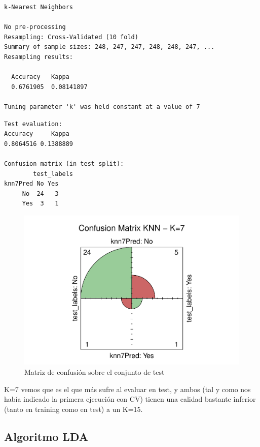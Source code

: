 \begin{verbatim}
k-Nearest Neighbors 

No pre-processing
Resampling: Cross-Validated (10 fold) 
Summary of sample sizes: 248, 247, 247, 248, 248, 247, ... 
Resampling results:

  Accuracy   Kappa     
  0.6761905  0.08141897

Tuning parameter 'k' was held constant at a value of 7
\end{verbatim}

\begin{verbatim}
Test evaluation:
Accuracy     Kappa 
0.8064516 0.1388889

Confusion matrix (in test split):
        test_labels
knn7Pred No Yes
     No  24   3
     Yes  3   1 
\end{verbatim}

\begin{figure}[H]\center\includegraphics[width=.9\linewidth]{img/Clasificacion_files/figure-latex/unnamed-chunk-14-1}\caption{Matriz de confusión sobre el conjunto de test}\end{figure}

K=7 vemos que es el que más sufre al evaluar en test, y ambos (tal y como nos había indicado la primera ejecución con CV) tienen una calidad bastante inferior (tanto en training como en test) a un K=15.

\subsection{Algoritmo LDA}
